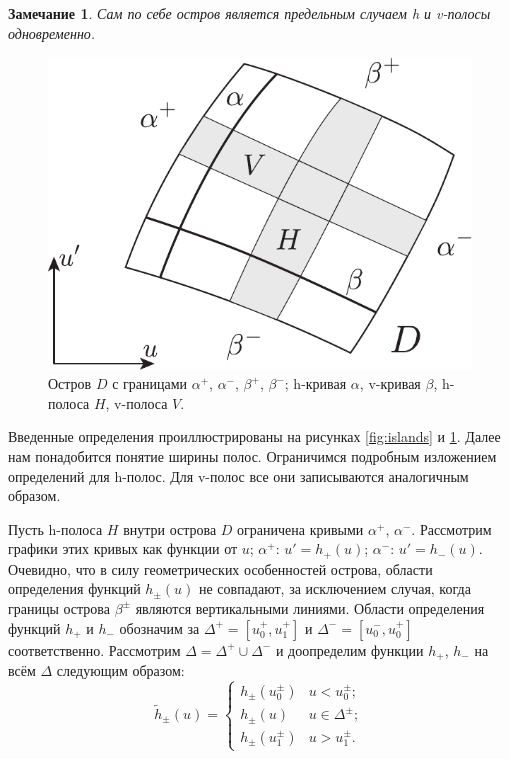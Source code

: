 \documentclass{article}
\newtheorem{remark}{Замечание}
\begin{document}
\begin{remark}
	Сам по себе остров является предельным случаем \emph{h} и \emph{v}-полосы одновременно.
\label{rem:island}
\end{remark}



\begin{figure}[h]
\centering
  \includegraphics[scale = 0.8]{pic/curves and strips}
  \caption{Остров $D$ с границами $\alpha^+$, $\alpha^-$, $\beta^+$, $\beta^-$; h-кривая $\alpha$, v-кривая $\beta$, h-полоса $H$, v-полоса $V$.}
\label{fig:curves-and-strips}
\end{figure}

Введенные определения проиллюстрированы на рисунках \ref{fig:islands} и \ref{fig:curves-and-strips}.
Далее нам понадобится понятие ширины полос.
Ограничимся подробным изложением определений для h-полос.
Для v-полос все они записываются аналогичным образом.

Пусть h-полоса $H$ внутри острова $D$ ограничена кривыми $\alpha^+$, $\alpha^-$.
Рассмотрим графики этих кривых как функции от $u$; $\alpha^+$: $u' = h_+(u)$; $\alpha^-$: $u' = h_-(u)$.
Очевидно, что в силу геометрических особенностей острова, области определения функций $h_{\pm}(u)$ не совпадают, за исключением случая, когда границы острова $\beta^{\pm}$ являются вертикальными линиями.
Области определения функций $h_+$ и $h_-$ обозначим за $\Delta^+ = [u_0^+, u_1^+]$ и $\Delta^- = [u_0^-, u_0^+]$ соответственно.
Рассмотрим $\Delta = \Delta^+ \cup \Delta^-$ и доопределим функции $h_+$, $h_-$ на всём $\Delta$ следующим образом:
\begin{equation}
	\widetilde{h}_{\pm}(u) = \begin{cases}
		h_{\pm}(u_0^{\pm}) & u < u_0^{\pm}; \\
		h_{\pm}(u) & u \in \Delta^{\pm}; \\
		h_{\pm}(u_1^{\pm}) & u > u_1^{\pm}.
	\end{cases}
\end{equation}
\end{document}
